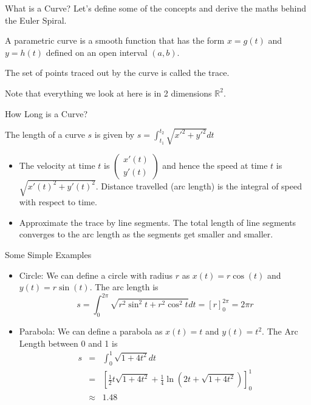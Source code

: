 \documentclass{beamer}
\begin{document}
\begin{frame}{What is a Curve?}
	Let's define some of the concepts and derive the maths behind the Euler Spiral.
	
		\begin{definition}
			A parametric curve is a smooth function that has the form
			$x = g(t)$ and $y=h(t)$ defined on an open interval $(a, b)$.
		
			The set of points traced out by the curve is called the trace.
		\end{definition}
		Note that everything we look at here is in 2 dimensions $\mathbb{R}^2$.
	
\end{frame}

\begin{frame}{How Long is a Curve?}
	\begin{definition}
		The length of a curve $s$ is given by
		$s = \int_{t_1}^{t_2} \sqrt{x'^2+y'^2}dt$
	\end{definition}
	\begin{itemize}
		\item 	The velocity at time $t$ is $\left( \begin{array}{c}
			x'(t)\\
			y'(t)
		\end{array} \right)$ and hence the speed at time $t$ is $\sqrt{x'(t)^2+y'(t)^2}$. Distance travelled (arc length) is the integral of speed with respect to time. 
		
		\item Approximate the trace by line segments. The total length of line segments converges to the arc length as the segments get smaller and smaller.
	\end{itemize}

\end{frame}

\begin{frame}{Some Simple Examples}
\begin{itemize}
	
	\item Circle: We can define a circle with radius $r$ as $x(t)=r \cos(t)$ and $y(t)= r \sin(t)$. The arc length is 
	\[
	s = \int_{0}^{2 \pi} \sqrt{r^2 \sin^2 t + r^2 \cos^2 t}dt = \left[r \right]_{0}^{2 \pi} = 2 \pi r
	\]
	
	\item Parabola: We can define a parabola as $x(t)=t$ and $y(t)=t^2$. The Arc Length between 0 and 1 is 
	\begin{eqnarray*}
	s &=& \int_{0}^{1} \sqrt{1+4t^2}dt \\ &=& \left[\frac{1}{2} t\sqrt{1+ 4 t^2} +\frac{1}{4} \ln \left(2 t+\sqrt{1+ 4 t^2} \right) \right]_{0}^1 \\
	&\approx&	 1.48
	\end{eqnarray*}
\end{itemize}

\end{frame}
\end{document}
